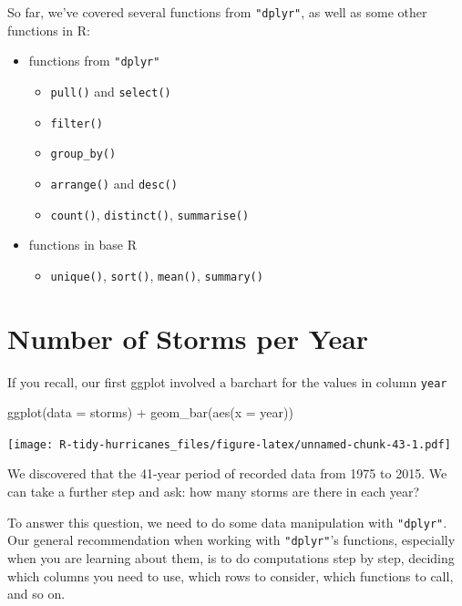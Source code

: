 \documentclass[
]{book}
\newenvironment{Shaded}{\begin{snugshade}}{\end{snugshade}}
\newcommand{\AttributeTok}[1]{\textcolor[rgb]{0.77,0.63,0.00}{#1}}
\newcommand{\FunctionTok}[1]{\textcolor[rgb]{0.00,0.00,0.00}{#1}}
\newcommand{\NormalTok}[1]{#1}
\newcommand{\SpecialCharTok}[1]{\textcolor[rgb]{0.00,0.00,0.00}{#1}}
\providecommand{\tightlist}{%
  \setlength{\itemsep}{0pt}\setlength{\parskip}{0pt}}
\begin{document}
So far, we've covered several functions from \texttt{"dplyr"}, as well as some other
functions in R:

\begin{itemize}
\tightlist
\item
  functions from \texttt{"dplyr"}

  \begin{itemize}
  \tightlist
  \item
    \texttt{pull()} and \texttt{select()}
  \item
    \texttt{filter()}
  \item
    \texttt{group\_by()}
  \item
    \texttt{arrange()} and \texttt{desc()}
  \item
    \texttt{count()}, \texttt{distinct()}, \texttt{summarise()}
  \end{itemize}
\item
  functions in base R

  \begin{itemize}
  \tightlist
  \item
    \texttt{unique()}, \texttt{sort()}, \texttt{mean()}, \texttt{summary()}
  \end{itemize}
\end{itemize}

\hypertarget{number-of-storms-per-year}{%
\section{Number of Storms per Year}\label{number-of-storms-per-year}}

If you recall, our first ggplot involved a barchart for the values in column
\texttt{year}

\begin{Shaded}
\begin{Highlighting}[]
\FunctionTok{ggplot}\NormalTok{(}\AttributeTok{data =}\NormalTok{ storms) }\SpecialCharTok{+} 
  \FunctionTok{geom\_bar}\NormalTok{(}\FunctionTok{aes}\NormalTok{(}\AttributeTok{x =}\NormalTok{ year))}
\end{Highlighting}
\end{Shaded}

\texttt{[image: R-tidy-hurricanes\_files/figure-latex/unnamed-chunk-43-1.pdf]}

We discovered that the 41-year period of recorded data from 1975 to 2015. We
can take a further step and ask: how many storms are there in each year?

To answer this question, we need to do some data manipulation with \texttt{"dplyr"}.
Our general recommendation when working with \texttt{"dplyr"}'s functions, especially
when you are learning about them, is to do computations step by step, deciding
which columns you need to use, which rows to consider, which functions to call,
and so on.
\end{document}
